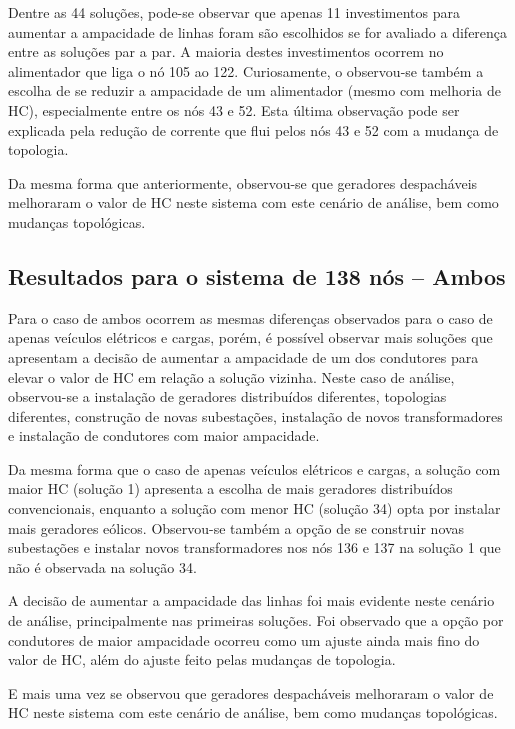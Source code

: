 Dentre as 44 soluções, pode-se observar que apenas 11 investimentos para aumentar a ampacidade de linhas foram são escolhidos se for avaliado a diferença entre as soluções par a par. A maioria destes investimentos ocorrem no alimentador que liga o nó 105 ao 122. Curiosamente, o observou-se também a escolha de se reduzir a ampacidade de um alimentador (mesmo com melhoria de \ac{HC}), especialmente entre os nós 43 e 52. Esta última observação pode ser explicada pela redução de corrente que flui pelos nós 43 e 52 com a mudança de topologia.

Da mesma forma que anteriormente, observou-se que geradores despacháveis melhoraram o valor de HC neste sistema com este cenário de análise, bem como mudanças topológicas.

\subsection{Resultados para o sistema de 138 nós -- Ambos}

Para o caso de ambos ocorrem as mesmas diferenças observados para o caso de apenas veículos elétricos e cargas, porém, é possível observar mais soluções que apresentam a decisão de aumentar a ampacidade de um dos condutores para elevar o valor de \ac{HC} em relação a solução vizinha. Neste caso de análise, observou-se a instalação de geradores distribuídos diferentes, topologias diferentes, construção de novas subestações, instalação de novos transformadores e instalação de condutores com maior ampacidade.

Da mesma forma que o caso de apenas veículos elétricos e cargas, a solução com maior \ac{HC} (solução 1) apresenta a escolha de mais geradores distribuídos convencionais, enquanto a solução com menor \ac{HC} (solução 34) opta por instalar mais geradores eólicos. Observou-se também a opção de se construir novas subestações e instalar novos transformadores nos nós 136 e 137 na solução 1 que não é observada na solução 34.

A decisão de aumentar a ampacidade das linhas foi mais evidente neste cenário de análise, principalmente nas primeiras soluções. Foi observado que a opção por condutores de maior ampacidade ocorreu como um ajuste ainda mais fino do valor de \ac{HC}, além do ajuste feito pelas mudanças de topologia.

E mais uma vez se observou que geradores despacháveis melhoraram o valor de HC neste sistema com este cenário de análise, bem como mudanças topológicas.



